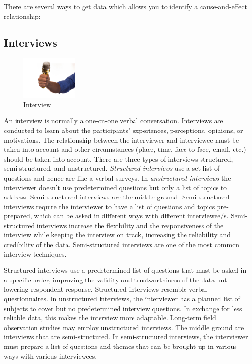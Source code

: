 \documentclass[
  12pt,
  oneside]{book}
\theoremstyle{definition}
\theoremstyle{definition}
\theoremstyle{definition}
\theoremstyle{definition}
\theoremstyle{remark}
\begin{document}
There are several ways to get data which allows you to identify a cause-and-effect relationship:

\hypertarget{interviews}{%
\subsection{Interviews}\label{interviews}}

\begin{figure}
\centering
\includegraphics[width=0.25\textwidth,height=\textheight]{fig/interview.jpg}
\caption[\label{fig:interview} Interview]{\label{fig:interview} Interview\footnotemark{}}
\end{figure}

An interview is normally a one-on-one verbal conversation. Interviews are conducted to learn about the participants' experiences, perceptions, opinions, or motivations. The relationship between the interviewer and interviewee must be taken into account and other circumstances (place, time, face to face, email, etc.) should be taken into account.
There are three types of interviews structured, semi-structured, and unstructured.
\emph{Structured interviews} use a set list of questions and hence are like a verbal surveys. In \emph{unstructured interviews} the interviewer doesn't use predetermined questions but only a list of topics to address. Semi-structured interviews are the middle ground. Semi-structured interviews require the interviewer to have a list of questions and topics pre-prepared, which can be asked in different ways with different interviewee/s. Semi-structured interviews increase the flexibility and the responsiveness of the interview while keeping the interview on track, increasing the reliability and credibility of the data. Semi-structured interviews are one of the most common interview techniques.

Structured interviews use a predetermined list of questions that must be asked in a specific order, improving the validity and trustworthiness of the data but lowering respondent response. Structured interviews resemble verbal questionnaires.
In unstructured interviews, the interviewer has a planned list of subjects to cover but no predetermined interview questions. In exchange for less reliable data, this makes the interview more adaptable. Long-term field observation studies may employ unstructured interviews.
The middle ground are interviews that are semi-structured. In semi-structured interviews, the interviewer must prepare a list of questions and themes that can be brought up in various ways with various interviewees.
\end{document}
